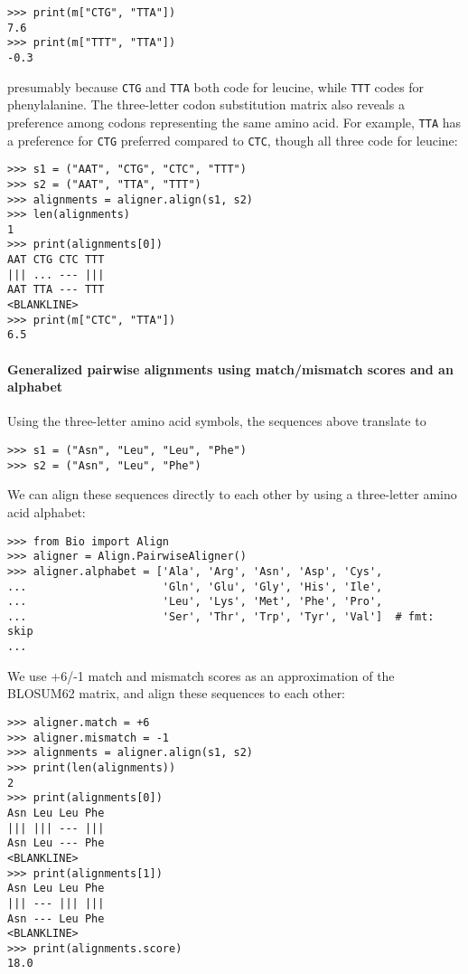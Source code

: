 \begin{verbatim}
>>> print(m["CTG", "TTA"])
7.6
>>> print(m["TTT", "TTA"])
-0.3
\end{verbatim}
presumably because \verb+CTG+ and \verb+TTA+ both code for leucine, while \verb+TTT+ codes for phenylalanine. The three-letter codon substitution matrix also reveals a preference among codons representing the same amino acid. For example, \verb+TTA+ has a preference for \verb+CTG+ preferred compared to \verb+CTC+, though all three code for leucine:

\begin{verbatim}
>>> s1 = ("AAT", "CTG", "CTC", "TTT")
>>> s2 = ("AAT", "TTA", "TTT")
>>> alignments = aligner.align(s1, s2)
>>> len(alignments)
1
>>> print(alignments[0])
AAT CTG CTC TTT
||| ... --- |||
AAT TTA --- TTT
<BLANKLINE>
>>> print(m["CTC", "TTA"])
6.5
\end{verbatim}

\paragraph*{Generalized pairwise alignments using match/mismatch scores and an alphabet}

Using the three-letter amino acid symbols, the sequences above translate to

\begin{verbatim}
>>> s1 = ("Asn", "Leu", "Leu", "Phe")
>>> s2 = ("Asn", "Leu", "Phe")
\end{verbatim}
We can align these sequences directly to each other by using a three-letter amino acid alphabet:

\begin{verbatim}
>>> from Bio import Align
>>> aligner = Align.PairwiseAligner()
>>> aligner.alphabet = ['Ala', 'Arg', 'Asn', 'Asp', 'Cys',
...                     'Gln', 'Glu', 'Gly', 'His', 'Ile',
...                     'Leu', 'Lys', 'Met', 'Phe', 'Pro',
...                     'Ser', 'Thr', 'Trp', 'Tyr', 'Val']  # fmt: skip
...
\end{verbatim}
We use +6/-1 match and mismatch scores as an approximation of the BLOSUM62 matrix, and align these sequences to each other:

\begin{verbatim}
>>> aligner.match = +6
>>> aligner.mismatch = -1
>>> alignments = aligner.align(s1, s2)
>>> print(len(alignments))
2
>>> print(alignments[0])
Asn Leu Leu Phe
||| ||| --- |||
Asn Leu --- Phe
<BLANKLINE>
>>> print(alignments[1])
Asn Leu Leu Phe
||| --- ||| |||
Asn --- Leu Phe
<BLANKLINE>
>>> print(alignments.score)
18.0
\end{verbatim}

